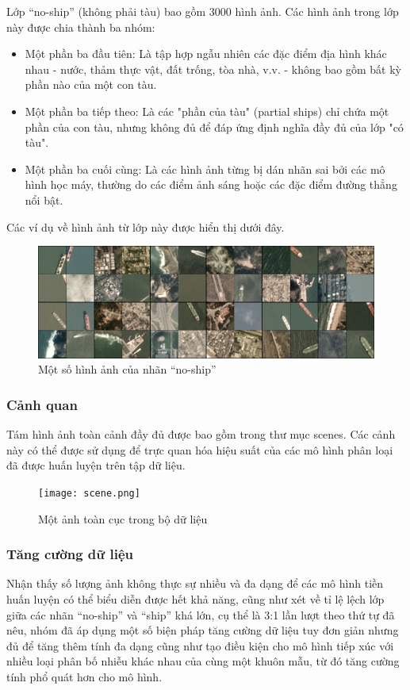 \documentclass[a4paper,12pt]{article}
\begin{document}
Lớp ``no-ship'' (không phải tàu) bao gồm 3000 hình ảnh. Các hình ảnh trong lớp này được chia thành ba nhóm:
\begin{itemize}
    \item Một phần ba đầu tiên: Là tập hợp ngẫu nhiên các đặc điểm địa hình khác nhau - nước, thảm thực vật, đất trống, tòa nhà, v.v. - không bao gồm bất kỳ phần nào của một con tàu.
    \item Một phần ba tiếp theo: Là các "phần của tàu" (partial ships) chỉ chứa một phần của con tàu, nhưng không đủ để đáp ứng định nghĩa đầy đủ của lớp "có tàu".
    \item Một phần ba cuối cùng: Là các hình ảnh từng bị dán nhãn sai bởi các mô hình học máy, thường do các điểm ảnh sáng hoặc các đặc điểm đường thẳng nổi bật.
\end{itemize} 
Các ví dụ về hình ảnh từ lớp này được hiển thị dưới đây.
\begin{figure}[H]
\centering
\includegraphics[width=15cm]{no-ship_image.png}
\caption{Một số hình ảnh của nhãn ``no-ship''}
\end{figure}
\subsubsection{Cảnh quan}
Tám hình ảnh toàn cảnh đầy đủ được bao gồm trong thư mục scenes. Các cảnh này có thể được sử dụng để trực quan hóa hiệu suất của các mô hình phân loại đã được huấn luyện trên tập dữ liệu.
\begin{figure}[H]
\centering
\texttt{[image: scene.png]}
\caption{Một ảnh toàn cục trong bộ dữ liệu}
\end{figure}

\subsubsection{Tăng cường dữ liệu}
Nhận thấy số lượng ảnh không thực sự nhiều và đa dạng để các mô hình tiền huấn luyện có thể biểu diễn được hết khả năng, cũng như xét về tỉ lệ lệch lớp giữa các nhãn ``no-ship'' và ``ship'' khá lớn, cụ thể là 3:1 lần lượt theo thứ tự đã nêu, nhóm đã áp dụng một số biện pháp tăng cường dữ liệu tuy đơn giản nhưng đủ để tăng thêm tính đa dạng cũng như tạo điều kiện cho mô hình tiếp xúc với nhiều loại phân bố nhiễu khác nhau của cùng một khuôn mẫu, từ đó tăng cường tính phổ quát hơn cho mô hình.
\end{document}
